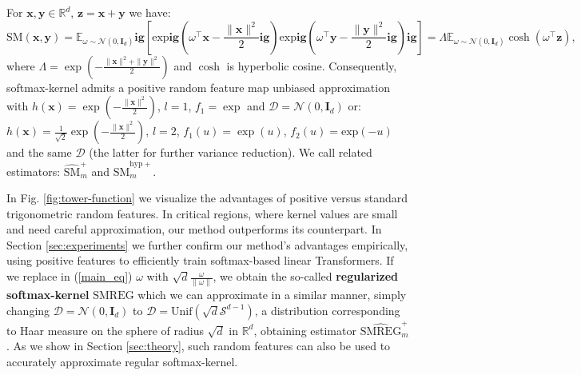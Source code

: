 \begin{lemma}
\label{pos_random_features_lemma}
For $\mathbf{x}, \mathbf{y} \in \mathbb{R}^{d}$, $\mathbf{z}=\mathbf{x}+\mathbf{y}$ we have:
\begin{equation}
\label{main_eq}
\mathrm{SM}(\mathbf{x},\mathbf{y}) = 
\mathbb{E}_{\omega \sim \mathcal{N}(0,\mathbf{I}_{d})}\!\mathbf{ig}[\mathrm{exp}\!\mathbf{ig}(\omega^{\top}\mathbf{x} - \frac{\|\mathbf{x}\|^{2}}{2}\mathbf{ig})\mathrm{exp}\!\mathbf{ig}(\omega^{\top}\mathbf{y}-\frac{\|\mathbf{y}\|^{2}}{2}\mathbf{ig})\mathbf{ig}]
=\Lambda \mathbb{E}_{\omega \sim \mathcal{N}(0,\mathbf{I}_{d})}\cosh(\omega^{\top}\mathbf{z}),
\end{equation}
where $\Lambda=\exp(-\frac{\|\mathbf{x}\|^{2}+\|\mathbf{y}\|^{2}}{2})$ and $\cosh$ is hyperbolic cosine. Consequently, softmax-kernel admits a positive random feature map unbiased approximation with  $h(\mathbf{x})=\exp(-\frac{\|\mathbf{x}\|^{2}}{2})$, $l=1$, $f_{1}=\exp$ and $\mathcal{D}=\mathcal{N}(0, \mathbf{I}_{d})$ or: $h(\mathbf{x})=\frac{1}{\sqrt{2}}\exp(-\frac{\|\mathbf{x}\|^{2}}{2})$, $l=2$, $f_{1}(u)=\exp(u)$, $f_{2}(u)=\mathrm{exp}(-u)$ and the same $\mathcal{D}$ (the latter for further variance reduction). We call related estimators: $\widehat{\mathrm{SM}}^{+}_{m}$ and $\widehat{\mathrm{SM}}^{\mathrm{hyp+}}_{m}$.
\end{lemma}

In Fig. \ref{fig:tower-function} we visualize the advantages of positive versus standard trigonometric random features. In critical regions, where kernel values are small and need careful approximation, our method outperforms its counterpart. In Section \ref{sec:experiments} we further confirm our method's advantages empirically, using positive features to efficiently train softmax-based linear Transformers. If we replace in (\ref{main_eq}) $\omega$ with $\sqrt{d}\frac{\omega}{\|\omega\|}$, we obtain the so-called \textbf{regularized softmax-kernel} $\mathrm{SMREG}$ which we can approximate in a similar manner, simply changing $\mathcal{D}=\mathcal{N}(0,\mathbf{I}_{d})$ to $\mathcal{D} = \mathrm{Unif}(\sqrt{d}\mathcal{S}^{d-1})$, a distribution corresponding to Haar measure on the sphere of radius $\sqrt{d}$ in $\mathbb{R}^{d}$, obtaining estimator $\widehat{\mathrm{SMREG}}^{+}_{m}$. As we show in Section \ref{sec:theory}, such random features can also be used to accurately approximate regular softmax-kernel.

